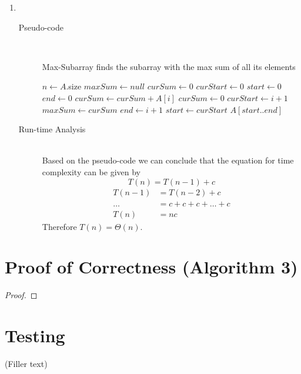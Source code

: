 \documentclass[paper=a4, fontsize=11pt]{scrartcl} %
\numberwithin{equation}{section} %
\numberwithin{figure}{section} %
\numberwithin{table}{section} %
\begin{document}
\begin{enumerate}[label=\bfseries Algorithm \arabic*:]
    \item \hfill \\
    \begin{description}
        \item[Pseudo-code] \hfill \\
        \begin{algorithmc}
            \caption{Max-Subarray finds the subarray with the max sum of all its elements}
                \State $n \gets A$.size
                \State $maxSum \gets null$
                \State $curSum \gets 0$
                \State $curStart \gets 0$
                \State $start \gets 0$
                \State $end \gets 0$
                    \State $curSum \gets curSum + A[i]$
                        \State $curSum \gets 0$
                        \State $curStart \gets i + 1$
                    \EndIf
                        \State $maxSum \gets curSum$
                        \State $end \gets i + 1$
                        \State $start \gets curStart$
                    \EndIf
                \EndFor
                \State \Return $A[start..end]$
            \EndFunction
        \end{algorithmc}
        \item[Run-time Analysis] \hfill \\
        Based on the pseudo-code we can conclude that the equation for 
        time complexity can be given by
        \[ T(n) = T(n - 1) + c \]
        \begin{align*}
            T(n - 1) & = T(n - 2) + c \\
            \ldots & = c + c + c + \ldots + c \\
            T(n) & = nc
        \end{align*}
        Therefore $T(n) = \Theta(n)$.
    \end{description}
\end{enumerate}

\section{Proof of Correctness (Algorithm 3)}
\begin{proof}
\end{proof}

\section{Testing}
(Filler text)
\end{document}
